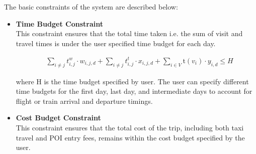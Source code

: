 \documentclass[sigconf,authordraft]{acmart}
\begin{document}
The basic constraints of the system are described below:

\begin{itemize}

\item \textbf{Time Budget Constraint}\\
This constraint ensures that the total time taken i.e. the sum of visit and travel times is under the user specified time budget for each day.

\begin{align}
\label{mul_day_9}
    & \sum_{i \ne j} t^{w}_{i,j} \cdot w_{i,j,d}
    + \sum_{i \ne j} t^{t}_{i,j} \cdot x_{i,j,d}
    + \sum_{i \in V} \text{t}(v_i) \cdot y_{i,d} \leq H
\end{align}

where H is the time budget specified by user. The user can specify different time budgets for the first day, last day, and intermediate days to account for flight or train arrival and departure timings.
\\[1ex]
\item \textbf{Cost Budget Constraint} \\
 This constraint ensures that the total cost of the trip, including both taxi travel and POI entry fees, remains within the cost budget specified by the user.


\end{itemize}
\end{document}
